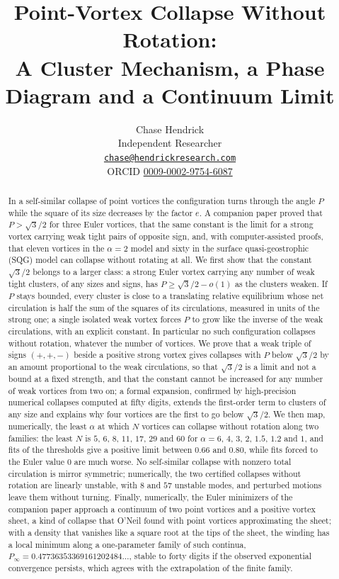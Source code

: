 \documentclass[11pt]{article}
\title{\Large\bfseries Point-Vortex Collapse Without Rotation:\\ A Cluster Mechanism, a Phase Diagram and a Continuum Limit}
\author{Chase Hendrick\\[0.2em] {\small Independent Researcher}\\ {\small\href{mailto:chase@hendrickresearch.com}{\texttt{chase@hendrickresearch.com}}}\\ {\small ORCID \href{https://orcid.org/0009-0002-9754-6087}{0009-0002-9754-6087}}}
\date{}
\theoremstyle{definition}
\begin{document}
\maketitle

\begin{abstract}
In a self-similar collapse of point vortices the configuration turns through the angle $P$ while the square of its size decreases by the factor $e$. A companion paper proved that $P > \sqrt{3}/2$ for three Euler vortices, that the same constant is the limit for a strong vortex carrying weak tight pairs of opposite sign, and, with computer-assisted proofs, that eleven vortices in the $\alpha = 2$ model and sixty in the surface quasi-geostrophic (SQG) model can collapse without rotating at all. We first show that the constant $\sqrt{3}/2$ belongs to a larger class: a strong Euler vortex carrying any number of weak tight clusters, of any sizes and signs, has $P \ge \sqrt{3}/2 - o(1)$ as the clusters weaken. If $P$ stays bounded, every cluster is close to a translating relative equilibrium whose net circulation is half the sum of the squares of its circulations, measured in units of the strong one; a single isolated weak vortex forces $P$ to grow like the inverse of the weak circulations, with an explicit constant. In particular no such configuration collapses without rotation, whatever the number of vortices. We prove that a weak triple of signs $(+,+,-)$ beside a positive strong vortex gives collapses with $P$ below $\sqrt{3}/2$ by an amount proportional to the weak circulations, so that $\sqrt{3}/2$ is a limit and not a bound at a fixed strength, and that the constant cannot be increased for any number of weak vortices from two on; a formal expansion, confirmed by high-precision numerical collapses computed at fifty digits, extends the first-order term to clusters of any size and explains why four vortices are the first to go below $\sqrt{3}/2$. We then map, numerically, the least $\alpha$ at which $N$ vortices can collapse without rotation along two families: the least $N$ is $5$, $6$, $8$, $11$, $17$, $29$ and $60$ for $\alpha = 6$, $4$, $3$, $2$, $1.5$, $1.2$ and $1$, and fits of the thresholds give a positive limit between $0.66$ and $0.80$, while fits forced to the Euler value $0$ are much worse. No self-similar collapse with nonzero total circulation is mirror symmetric; numerically, the two certified collapses without rotation are linearly unstable, with $8$ and $57$ unstable modes, and perturbed motions leave them without turning. Finally, numerically, the Euler minimizers of the companion paper approach a continuum of two point vortices and a positive vortex sheet, a kind of collapse that O'Neil found with point vortices approximating the sheet; with a density that vanishes like a square root at the tips of the sheet, the winding has a local minimum along a one-parameter family of such continua, $P_\infty = 0.47736353369161202484\ldots$, stable to forty digits if the observed exponential convergence persists, which agrees with the extrapolation of the finite family.


\end{abstract}
\end{document}
